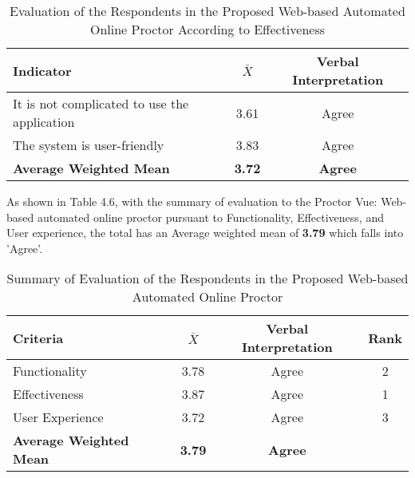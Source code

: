 \begin{table}[h!]
   \begin{center}
      \begin{tabular}{|m{20em}|c|c|}
         \hline
         \textbf{Indicator}                           & \textbf{$\bar{X}$} & \textbf{Verbal Interpretation} \\
         \hline
         It is not complicated to use the application & 3.61               & Agree                          \\
         \hline
         The system is user-friendly                  & 3.83               & Agree                          \\
         \hline
         \textbf{Average Weighted Mean}               & \textbf{3.72}      & \textbf{Agree}                 \\
         \hline
      \end{tabular}
   \end{center}
   \caption{Evaluation of the Respondents in the Proposed Web-based Automated Online Proctor According to Effectiveness}
\end{table}

As shown in Table 4.6, with the summary of evaluation to the Proctor Vue: Web-based automated online proctor pursuant to Functionality, Effectiveness, and User experience, the total has an Average weighted mean of \textbf{3.79} which falls into 'Agree'.

\begin{table}[h!]
   \begin{center}
      \begin{tabular}{|m{12em}|c|c|c|}
         \hline
         \textbf{Criteria}              & \textbf{$\bar{X}$} & \textbf{Verbal Interpretation} & \textbf{Rank} \\
         \hline
         Functionality                  & 3.78               & Agree                          & 2             \\
         \hline
         Effectiveness                  & 3.87               & Agree                          & 1             \\
         \hline
         User Experience                & 3.72               & Agree                          & 3             \\
         \hline
         \textbf{Average Weighted Mean} & \textbf{3.79}      & \textbf{Agree}                 &               \\
         \hline
      \end{tabular}
   \end{center}
   \caption{Summary of Evaluation of the Respondents in the Proposed Web-based Automated Online Proctor}
\end{table}
